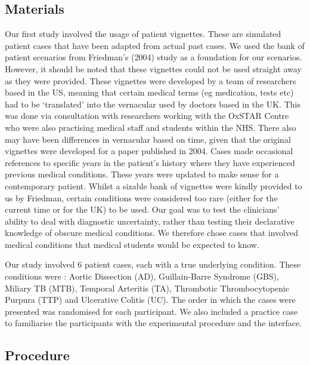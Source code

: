 \documentclass[a4paper, nobind]{templates/ociamthesis}
\begin{document}
\hypertarget{materials}{%
\subsection*{Materials}\label{materials}}

Our first study involved the usage of patient vignettes. These are simulated patient cases that have been adapted from actual past cases. We used the bank of patient scenarios from Friedman's (2004) study as a foundation for our scenarios. However, it should be noted that these vignettes could not be used straight away as they were provided. These vignettes were developed by a team of researchers based in the US, meaning that certain medical terms (eg medication, tests etc) had to be `translated' into the vernacular used by doctors based in the UK. This was done via consultation with researchers working with the OxSTAR Centre who were also practising medical staff and students within the NHS. There also may have been differences in vernacular based on time, given that the original vignettes were developed for a paper published in 2004. Cases made occasional references to specific years in the patient's history where they have experienced previous medical conditions. These years were updated to make sense for a contemporary patient. Whilst a sizable bank of vignettes were kindly provided to us by Friedman, certain conditions were considered too rare (either for the current time or for the UK) to be used. Our goal was to test the clinicians' ability to deal with diagnostic uncertainty, rather than testing their declarative knowledge of obscure medical conditions. We therefore chose cases that involved medical conditions that medical students would be expected to know.

Our study involved 6 patient cases, each with a true underlying condition. These conditions were : Aortic Dissection (AD), Guillain-Barre Syndrome (GBS), Miliary TB (MTB), Temporal Arteritis (TA), Thrombotic Thrombocytopenic Purpura (TTP) and Ulcerative Colitis (UC). The order in which the cases were presented was randomised for each participant. We also included a practice case to familiarise the participants with the experimental procedure and the interface.

\hypertarget{procedure}{%
\subsection*{Procedure}\label{procedure}}
\end{document}
